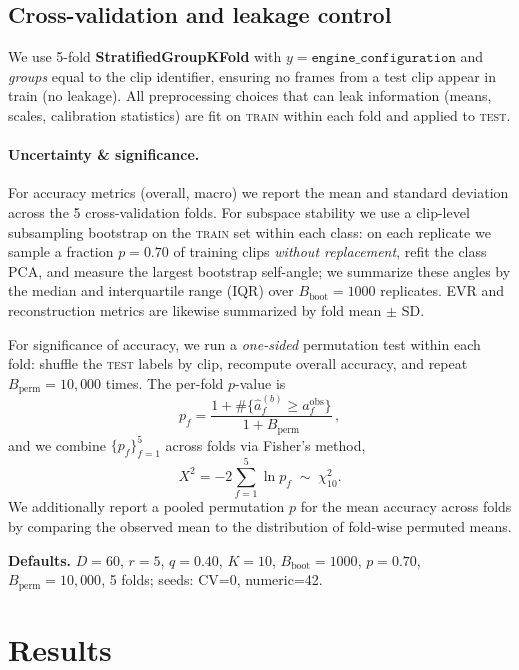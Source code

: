 \documentclass[11pt]{article}
\newcommand{\D}{\ensuremath{D}\xspace}
\newcommand{\rankr}{\ensuremath{r}\xspace}
\begin{document}
\subsection*{Cross-validation and leakage control}
We use 5-fold \textbf{StratifiedGroupKFold} with $y=\texttt{engine\_configuration}$ and \emph{groups} equal to the clip identifier, ensuring no frames from a test clip appear in train (no leakage). All preprocessing choices that can leak information (means, scales, calibration statistics) are fit on \textsc{train} within each fold and applied to \textsc{test}.

\paragraph{Uncertainty \& significance.}
For accuracy metrics (overall, macro) we report the mean and standard deviation across the 5 cross-validation folds. For subspace stability we use a clip-level subsampling bootstrap on the \textsc{train} set within each class: on each replicate we sample a fraction $p=0.70$ of training clips \emph{without replacement}, refit the class PCA, and measure the largest bootstrap self-angle; we summarize these angles by the median and interquartile range (IQR) over $B_{\text{boot}}=1000$ replicates. EVR and reconstruction metrics are likewise summarized by fold mean $\pm$ SD.

For significance of accuracy, we run a \emph{one-sided} permutation test within each fold: shuffle the \textsc{test} labels by clip, recompute overall accuracy, and repeat $B_{\text{perm}}=10{,}000$ times. The per-fold $p$-value is
\begin{equation}
p_f=\frac{1+\#\{\hat{a}^{(b)}_f \ge a^{\mathrm{obs}}_f\}}{1+B_{\text{perm}}}\,,
\end{equation}
and we combine $\{p_f\}_{f=1}^5$ across folds via Fisher’s method,
\[
X^2=-2\sum_{f=1}^{5}\ln p_f \;\sim\; \chi^2_{10}.
\]
We additionally report a pooled permutation $p$ for the mean accuracy across folds by comparing the observed mean to the distribution of fold-wise permuted means.

\bigskip
\noindent\textbf{Defaults.} $\D=60$, $\rankr=5$, $q=0.40$, $K=10$, $B_{\text{boot}}=1000$, $p=0.70$, $B_{\text{perm}}=10{,}000$, 5 folds; seeds: CV=0, numeric=42.

\section{Results}
\end{document}
